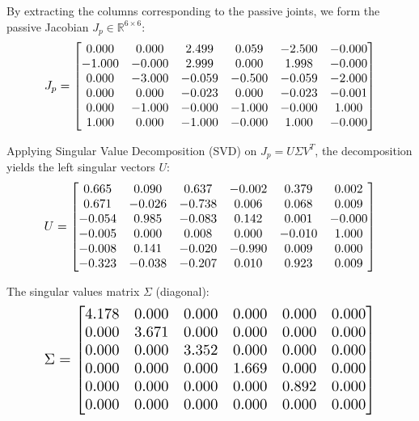 \documentclass[12pt,a4paper]{article}
\begin{document}
By extracting the columns corresponding to the passive joints, we form the passive Jacobian $J_p \in \mathbb{R}^{6 \times 6}$:
\begin{equation}
    \resizebox{0.85\textwidth}{!}{$ J_p = \begin{bmatrix}
  0.000 & 0.000 & 2.499 & 0.059 & -2.500 & -0.000 \\
  -1.000 & -0.000 & 2.999 & 0.000 & 1.998 & -0.000 \\
  0.000 & -3.000 & -0.059 & -0.500 & -0.059 & -2.000 \\
  0.000 & 0.000 & -0.023 & 0.000 & -0.023 & -0.001 \\
  0.000 & -1.000 & -0.000 & -1.000 & -0.000 & 1.000 \\
  1.000 & 0.000 & -1.000 & -0.000 & 1.000 & -0.000
\end{bmatrix} $}
\end{equation}

Applying Singular Value Decomposition (SVD) on $J_p = U \Sigma V^T$, the decomposition yields the left singular vectors $U$:
\begin{equation}
    \resizebox{0.85\textwidth}{!}{$ U = \begin{bmatrix}
  0.665 & 0.090 & 0.637 & -0.002 & 0.379 & 0.002 \\
  0.671 & -0.026 & -0.738 & 0.006 & 0.068 & 0.009 \\
  -0.054 & 0.985 & -0.083 & 0.142 & 0.001 & -0.000 \\
  -0.005 & 0.000 & 0.008 & 0.000 & -0.010 & 1.000 \\
  -0.008 & 0.141 & -0.020 & -0.990 & 0.009 & 0.000 \\
  -0.323 & -0.038 & -0.207 & 0.010 & 0.923 & 0.009
\end{bmatrix} $}
\end{equation}

The singular values matrix $\Sigma$ (diagonal):
\begin{equation}
    \resizebox{0.85\textwidth}{!}{$ \Sigma = \begin{bmatrix}
  4.178 & 0.000 & 0.000 & 0.000 & 0.000 & 0.000 \\
  0.000 & 3.671 & 0.000 & 0.000 & 0.000 & 0.000 \\
  0.000 & 0.000 & 3.352 & 0.000 & 0.000 & 0.000 \\
  0.000 & 0.000 & 0.000 & 1.669 & 0.000 & 0.000 \\
  0.000 & 0.000 & 0.000 & 0.000 & 0.892 & 0.000 \\
  0.000 & 0.000 & 0.000 & 0.000 & 0.000 & 0.000
\end{bmatrix} $}
\end{equation}
\end{document}
